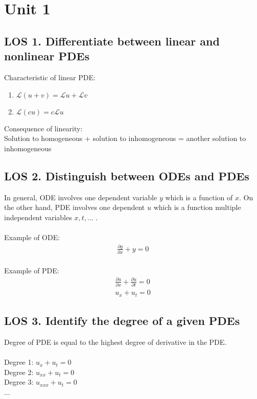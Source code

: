 \documentclass[12pt, a4paper]{article}
\begin{document}
\section*{Unit 1}
\vspace{1em}

\subsection*{LOS 1. Differentiate between linear and nonlinear PDEs}
Characteristic of linear PDE:
\begin{enumerate}
    \item $\mathcal{L}(u+v) = \mathcal{L}u + \mathcal{L}v$
    \item $\mathcal{L}(cu) = c\mathcal{L}u$
\end{enumerate}
Consequence of linearity: \\
Solution to homogeneous + solution to inhomogeneous = another solution to inhomogeneous\\
\vspace{0.3em}

\subsection*{LOS 2. Distinguish between ODEs and PDEs}
In general, ODE involves one dependent variable $y$ which is a function of $x$. On the other hand, PDE involves one dependent $u$ which is a function multiple independent variables $x, t, ...$ . \\ \\ 
Example of ODE:
\begin{gather*}
    \frac{\partial y}{\partial x} + y = 0
\end{gather*} \\
Example of PDE:
\begin{gather*}
    \frac{\partial u}{\partial x} + \frac{\partial u}{\partial t} = 0 \\
    u_{x} + u_{t} = 0
\end{gather*}
\vspace{0.3em}

\subsection*{LOS 3. Identify the degree of a given PDEs}
Degree of PDE is equal to the highest degree of derivative in the PDE.\\ \\
Degree 1: $u_{x} + u_{t} = 0$ \\
Degree 2: $u_{xx} + u_{t} = 0$ \\
Degree 3: $u_{xxx} + u_{t} = 0$ \\
... \\
\vspace{0.3em}
\end{document}
